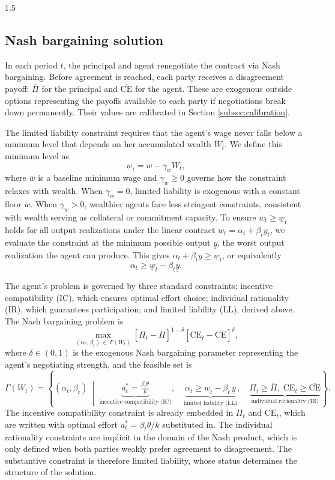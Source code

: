 \documentclass[12pt]{article}
\theoremstyle{definition}
\theoremstyle{plain}
\begin{document}
\begin{spacing}{1.5}
\subsection{Nash bargaining solution}\label{subsec:nash}

In each period $t$, the principal and agent renegotiate the contract via Nash bargaining. Before agreement is reached, each party receives a disagreement payoff: $\overline{\Pi}$ for the principal and $\overline{\text{CE}}$ for the agent. These are exogenous outside options representing the payoffs available to each party if negotiations break down permanently. Their values are calibrated in Section \ref{subsec:calibration}.

The limited liability constraint requires that the agent's wage never falls below a minimum level that depends on her accumulated wealth $W_t$. We define this minimum level as
\[
\underline{w}_t = \overline{w} - \gamma_w W_t,
\]
where $\overline{w}$ is a baseline minimum wage and $\gamma_w \geq 0$ governs how the constraint relaxes with wealth. When $\gamma_w = 0$, limited liability is exogenous with a constant floor $\overline{w}$. When $\gamma_w > 0$, wealthier agents face less stringent constraints, consistent with wealth serving as collateral or commitment capacity. To ensure $w_t \geq \underline{w}_t$ holds for all output realizations under the linear contract $w_t = \alpha_t + \beta_t y_t$, we evaluate the constraint at the minimum possible output $\underline{y}$, the worst output realization the agent can produce. This gives $\alpha_t + \beta_t \underline{y} \geq \underline{w}_t$, or equivalently
\[
\alpha_t \geq \underline{w}_t - \beta_t \underline{y}.
\]

The agent's problem is governed by three standard constraints: incentive compatibility (IC), which ensures optimal effort choice; individual rationality (IR), which guarantees participation; and limited liability (LL), derived above. The Nash bargaining problem is
\[
\max_{(\alpha_t,\,\beta_t)\,\in\,\Gamma(W_t)} [\Pi_t - \overline{\Pi}]^{1-\delta} [\text{CE}_t - \overline{\text{CE}}]^{\delta},
\]
where $\delta \in (0,1)$ is the exogenous Nash bargaining parameter representing the agent's negotiating strength, and the feasible set is
\[
\Gamma(W_t) = \left\{(\alpha_t,\beta_t)\;\middle|\;
\underbrace{a_t^* = \tfrac{\beta_t\theta}{k}}_{\text{incentive compatibility (IC)}},\quad
\underbrace{\alpha_t \geq \underline{w}_t - \beta_t\,\underline{y}}_{\text{limited liability (LL)}},\quad
\underbrace{\Pi_t \geq \overline{\Pi},\;\text{CE}_t \geq \overline{\text{CE}}}_{\text{individual rationality (IR)}}
\right\}.
\]
The incentive compatibility constraint is already embedded in $\Pi_t$ and $\text{CE}_t$, which are written with optimal effort $a_t^* = \beta_t\theta/k$ substituted in. The individual rationality constraints are implicit in the domain of the Nash product, which is only defined when both parties weakly prefer agreement to disagreement. The substantive constraint is therefore limited liability, whose status determines the structure of the solution.


\end{spacing}
\end{document}
